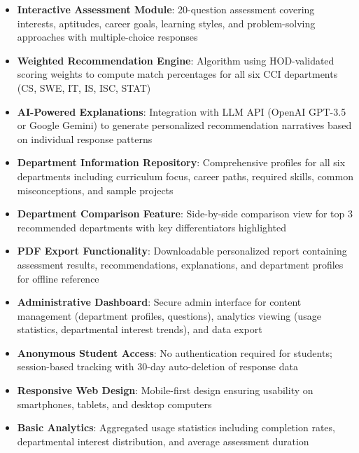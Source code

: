 \documentclass[12pt, a4paper]{article}
\begin{document}
\begin{itemize}[leftmargin=1.5em, itemsep=3pt]
    \item \textbf{Interactive Assessment Module}: 20-question assessment covering interests, aptitudes, career goals, learning styles, and problem-solving approaches with multiple-choice responses
    
    \item \textbf{Weighted Recommendation Engine}: Algorithm using HOD-validated scoring weights to compute match percentages for all six CCI departments (CS, SWE, IT, IS, ISC, STAT)
    
    \item \textbf{AI-Powered Explanations}: Integration with LLM API (OpenAI GPT-3.5 or Google Gemini) to generate personalized recommendation narratives based on individual response patterns
    
    \item \textbf{Department Information Repository}: Comprehensive profiles for all six departments including curriculum focus, career paths, required skills, common misconceptions, and sample projects
    
    \item \textbf{Department Comparison Feature}: Side-by-side comparison view for top 3 recommended departments with key differentiators highlighted
    
    \item \textbf{PDF Export Functionality}: Downloadable personalized report containing assessment results, recommendations, explanations, and department profiles for offline reference
    
    \item \textbf{Administrative Dashboard}: Secure admin interface for content management (department profiles, questions), analytics viewing (usage statistics, departmental interest trends), and data export
    
    \item \textbf{Anonymous Student Access}: No authentication required for students; session-based tracking with 30-day auto-deletion of response data
    
    \item \textbf{Responsive Web Design}: Mobile-first design ensuring usability on smartphones, tablets, and desktop computers
    
    \item \textbf{Basic Analytics}: Aggregated usage statistics including completion rates, departmental interest distribution, and average assessment duration
\end{itemize}
\end{document}
